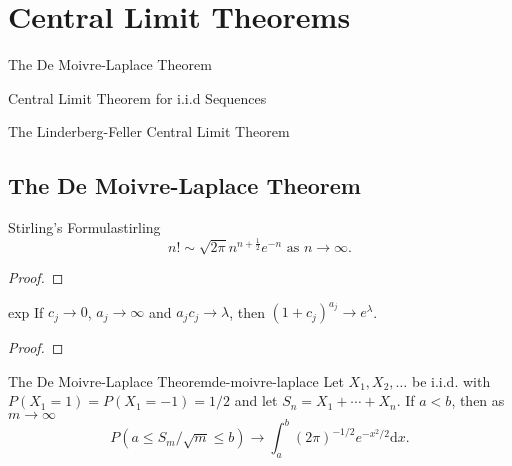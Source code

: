\chapter{Central Limit Theorems}

\begin{introduction}
    \item The De Moivre-Laplace Theorem
    \item Central Limit Theorem for i.i.d Sequences
    \item The Linderberg-Feller Central Limit Theorem
\end{introduction}

\section{The De Moivre-Laplace Theorem}

\begin{lemma}{Stirling's Formula}{stirling}
    \begin{equation}
        n ! \sim \sqrt{2 \pi} n^{n+\frac{1}{2}} e^{-n} \text{ as } n \rightarrow \infty.
    \end{equation}
\end{lemma}

\begin{proof}
    
\end{proof}

\begin{lemma}{}{exp}
    If $c_j \rightarrow 0$, $a_j \rightarrow \infty$ and $a_jc_j \rightarrow \lambda$, then $\left(1+c_j\right)^{a_j} \rightarrow e^ \lambda$.
\end{lemma}

\begin{proof}
    
\end{proof}

\begin{theorem}{The De Moivre-Laplace Theorem}{de-moivre-laplace}
    Let $X_{1}, X_{2}, \ldots$ be i.i.d. with $P\left(X_{1}=1\right)=P\left(X_{1}=-1\right)=1 / 2$ and let $S_{n}=X_{1}+\cdots+X_{n}$. If $a<b$, then as $m \rightarrow \infty$
    \begin{equation}
        P\left(a \leq S_{m} / \sqrt{m} \leq b\right) \rightarrow \int_{a}^{b}(2 \pi)^{-1 / 2} e^{-x^{2} / 2} \mathrm{d} x.
    \end{equation}
\end{theorem}

